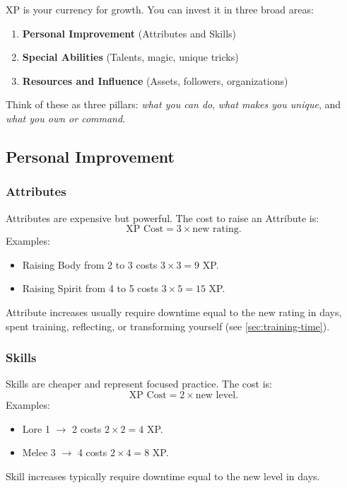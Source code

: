 XP is your currency for growth. You can invest it in three broad areas:

\begin{enumerate}
  \item \textbf{Personal Improvement} (Attributes and Skills)
  \item \textbf{Special Abilities} (Talents, magic, unique tricks)
  \item \textbf{Resources and Influence} (Assets, followers, organizations)
\end{enumerate}

Think of these as three pillars: \textit{what you can do}, \textit{what makes you unique},
and \textit{what you own or command}.

\subsection{Personal Improvement}

\subsubsection*{Attributes}
Attributes are expensive but powerful. The cost to raise an Attribute is:
\[
\text{XP Cost} = 3 \times \text{new rating}.
\]
Examples:
\begin{itemize}
  \item Raising Body from 2 to 3 costs $3 \times 3 = 9$ XP.
  \item Raising Spirit from 4 to 5 costs $3 \times 5 = 15$ XP.
\end{itemize}
Attribute increases usually require downtime equal to the new rating in days,
spent training, reflecting, or transforming yourself (see \ref{sec:training-time}).

\subsubsection*{Skills}
Skills are cheaper and represent focused practice. The cost is:
\[
\text{XP Cost} = 2 \times \text{new level}.
\]
Examples:
\begin{itemize}
  \item Lore 1 $\rightarrow$ 2 costs $2 \times 2 = 4$ XP.
  \item Melee 3 $\rightarrow$ 4 costs $2 \times 4 = 8$ XP.
\end{itemize}
Skill increases typically require downtime equal to the new level in days.

